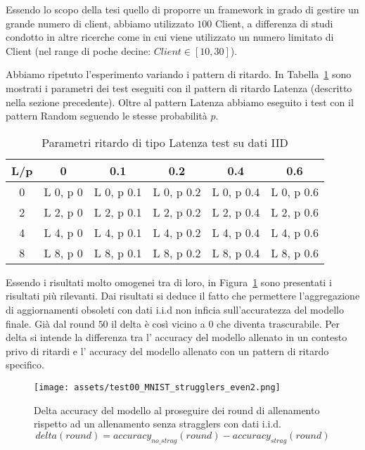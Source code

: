 \documentclass[a4paper, oneside, openright]{report}
\begin{document}
Essendo lo scopo della tesi quello di proporre un framework in grado di gestire un grande numero di client, abbiamo utilizzato $100$ Client, a differenza di studi condotto in altre ricerche come \cite{DBLP:journals/corr/abs-1812-06127} in cui viene utilizzato un numero limitato di Client (nel range di poche decine: $Client \in [10, 30]$). 

Abbiamo ripetuto l'esperimento variando i pattern di ritardo. In Tabella~\ref{tab:test-iid1-p} sono mostrati i parametri dei test eseguiti con il pattern di ritardo Latenza (descritto nella sezione precedente). Oltre al pattern Latenza abbiamo eseguito i test con il pattern Random seguendo le stesse probabilità $p$.

\begin{table}
    \centering
    \begin{tabular}{|c|c|c|c|c|c|} \hline 
         L/p&  0&  0.1&  0.2& 0.4  & 0.6\\ \hline 
         0&  L 0, p 0&  L 0, p 0.1&  L 0, p 0.2& L 0, p 0.4 &L 0, p 0.6\\ \hline 
         2&  L 2, p 0&  L 2, p 0.1&  L 2, p 0.2& L 2, p 0.4 &L 2, p 0.6\\ \hline 
         4&  L 4, p 0&  L 4, p 0.1&  L 4, p 0.2& L 4, p 0.4 &L 4, p 0.6\\ \hline 
         8&  L 8, p 0&  L 8, p 0.1&  L 8, p 0.2& L 8, p 0.4 &L 8, p 0.6\\ \hline
    \end{tabular}
    \caption{Parametri ritardo di tipo Latenza test su dati IID}
    \label{tab:test-iid1-p}
\end{table}

Essendo i risultati molto omogenei tra di loro, in Figura~\ref{fig:t00_MNIST_stag_even} sono presentati i risultati più rilevanti. Dai risultati si deduce il fatto che permettere l'aggregazione di aggiornamenti obsoleti con dati i.i.d non inficia sull'accuratezza del modello finale. Già dal round $50$ il delta è così vicino a $0$ che diventa trascurabile. Per delta si intende la differenza tra l' accuracy del modello allenato in un contesto privo di ritardi e l' accuracy del modello allenato con un pattern di ritardo specifico.

\begin{figure}[h]
\centering
\texttt{[image: assets/test00\_MNIST\_strugglers\_even2.png]}
\caption{Delta accuracy del modello al proseguire dei round di allenamento rispetto ad un allenamento senza stragglers con dati i.i.d. \\
$$delta(round) = accuracy_{no\_strag}(round) - accuracy_{strag}(round) $$}\label{fig:t00_MNIST_stag_even}
\end{figure}
\end{document}
